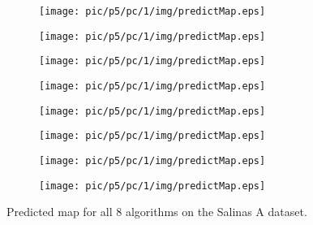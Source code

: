 \documentclass{article}
\begin{document}
	\begin{figure}
		\begin{subfigure}{0.12\textwidth}
			\texttt{[image: pic/p5/pc/1/img/predictMap.eps]}
			\caption{}
		\end{subfigure}
		\begin{subfigure}{0.12\textwidth}
			\texttt{[image: pic/p5/pc/1/img/predictMap.eps]}
			\caption{}
		\end{subfigure}
		\begin{subfigure}{0.12\textwidth}
			\texttt{[image: pic/p5/pc/1/img/predictMap.eps]}
			\caption{}
		\end{subfigure}
		\begin{subfigure}{0.12\textwidth}
			\texttt{[image: pic/p5/pc/1/img/predictMap.eps]}
			\caption{}
		\end{subfigure}
		\begin{subfigure}{0.12\textwidth}
			\texttt{[image: pic/p5/pc/1/img/predictMap.eps]}
			\caption{}
		\end{subfigure}
		\begin{subfigure}{0.12\textwidth}
			\texttt{[image: pic/p5/pc/1/img/predictMap.eps]}
			\caption{}
		\end{subfigure}
		\begin{subfigure}{0.12\textwidth}
			\texttt{[image: pic/p5/pc/1/img/predictMap.eps]}
			\caption{}
		\end{subfigure}
		\begin{subfigure}{0.12\textwidth}
			\texttt{[image: pic/p5/pc/1/img/predictMap.eps]}
			\caption{}
		\end{subfigure}
		\caption{Predicted map for all 8 algorithms on the Salinas A dataset.}
		\label{sapm}
	\end{figure}
\end{document}
